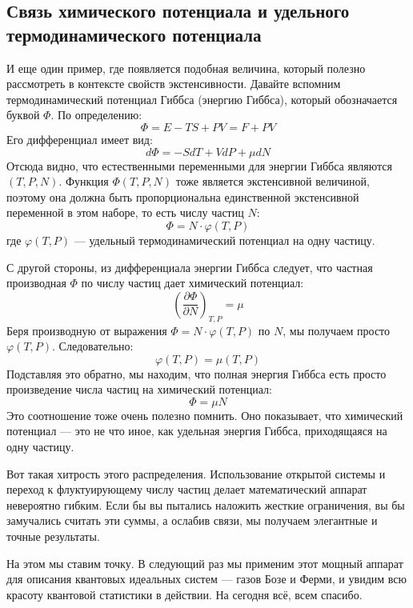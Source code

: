 \documentclass[../general/general]{subfiles}
\begin{document}
\subsection{Связь химического потенциала и удельного термодинамического потенциала}

И еще один пример, где появляется подобная величина, который полезно рассмотреть в контексте свойств экстенсивности. Давайте вспомним термодинамический потенциал Гиббса (энергию Гиббса), который обозначается буквой $\Phi$. По определению:
\begin{equation*}
    \Phi = E - TS + PV = F + PV
\end{equation*}
Его дифференциал имеет вид:
\begin{equation*}
    d\Phi = -S dT + V dP + \mu dN
\end{equation*}
Отсюда видно, что естественными переменными для энергии Гиббса являются $(T, P, N)$. Функция $\Phi(T, P, N)$ тоже является экстенсивной величиной, поэтому она должна быть пропорциональна единственной экстенсивной переменной в этом наборе, то есть числу частиц $N$:
\begin{equation*}
    \Phi = N \cdot \varphi(T, P)
\end{equation*}
где $\varphi(T, P)$ — удельный термодинамический потенциал на одну частицу.

С другой стороны, из дифференциала энергии Гиббса следует, что частная производная $\Phi$ по числу частиц дает химический потенциал:
\begin{equation*}
    \left( \frac{\partial \Phi}{\partial N} \right)_{T, P} = \mu
\end{equation*}
Беря производную от выражения $\Phi = N \cdot \varphi(T, P)$ по $N$, мы получаем просто $\varphi(T, P)$. Следовательно:
\begin{equation*}
    \varphi(T, P) = \mu(T, P)
\end{equation*}
Подставляя это обратно, мы находим, что полная энергия Гиббса есть просто произведение числа частиц на химический потенциал:
\begin{equation}
    \Phi = \mu N
    \label{eq:Phi_muN}
\end{equation}
Это соотношение тоже очень полезно помнить. Оно показывает, что химический потенциал — это не что иное, как удельная энергия Гиббса, приходящаяся на одну частицу.

Вот такая хитрость этого распределения. Использование открытой системы и переход к флуктуирующему числу частиц делает математический аппарат невероятно гибким. Если бы вы пытались наложить жесткие ограничения, вы бы замучались считать эти суммы, а ослабив связи, мы получаем элегантные и точные результаты.

На этом мы ставим точку. В следующий раз мы применим этот мощный аппарат для описания квантовых идеальных систем — газов Бозе и Ферми, и увидим всю красоту квантовой статистики в действии. На сегодня всё, всем спасибо.
\end{document}
